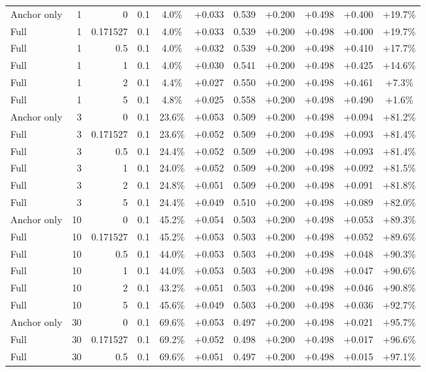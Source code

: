 \begin{table}[htbp]
\begin{tabular}{lrrrccccccc}
Anchor only & 1 & 0 & 0.1 & 4.0\% & +0.033 & 0.539 & +0.200 & +0.498 & +0.400 & +19.7\% \\
Full & 1 & 0.171527 & 0.1 & 4.0\% & +0.033 & 0.539 & +0.200 & +0.498 & +0.400 & +19.7\% \\
Full & 1 & 0.5 & 0.1 & 4.0\% & +0.032 & 0.539 & +0.200 & +0.498 & +0.410 & +17.7\% \\
Full & 1 & 1 & 0.1 & 4.0\% & +0.030 & 0.541 & +0.200 & +0.498 & +0.425 & +14.6\% \\
Full & 1 & 2 & 0.1 & 4.4\% & +0.027 & 0.550 & +0.200 & +0.498 & +0.461 & +7.3\% \\
Full & 1 & 5 & 0.1 & 4.8\% & +0.025 & 0.558 & +0.200 & +0.498 & +0.490 & +1.6\% \\
Anchor only & 3 & 0 & 0.1 & 23.6\% & +0.053 & 0.509 & +0.200 & +0.498 & +0.094 & +81.2\% \\
Full & 3 & 0.171527 & 0.1 & 23.6\% & +0.052 & 0.509 & +0.200 & +0.498 & +0.093 & +81.4\% \\
Full & 3 & 0.5 & 0.1 & 24.4\% & +0.052 & 0.509 & +0.200 & +0.498 & +0.093 & +81.4\% \\
Full & 3 & 1 & 0.1 & 24.0\% & +0.052 & 0.509 & +0.200 & +0.498 & +0.092 & +81.5\% \\
Full & 3 & 2 & 0.1 & 24.8\% & +0.051 & 0.509 & +0.200 & +0.498 & +0.091 & +81.8\% \\
Full & 3 & 5 & 0.1 & 24.4\% & +0.049 & 0.510 & +0.200 & +0.498 & +0.089 & +82.0\% \\
Anchor only & 10 & 0 & 0.1 & 45.2\% & +0.054 & 0.503 & +0.200 & +0.498 & +0.053 & +89.3\% \\
Full & 10 & 0.171527 & 0.1 & 45.2\% & +0.053 & 0.503 & +0.200 & +0.498 & +0.052 & +89.6\% \\
Full & 10 & 0.5 & 0.1 & 44.0\% & +0.053 & 0.503 & +0.200 & +0.498 & +0.048 & +90.3\% \\
Full & 10 & 1 & 0.1 & 44.0\% & +0.053 & 0.503 & +0.200 & +0.498 & +0.047 & +90.6\% \\
Full & 10 & 2 & 0.1 & 43.2\% & +0.051 & 0.503 & +0.200 & +0.498 & +0.046 & +90.8\% \\
Full & 10 & 5 & 0.1 & 45.6\% & +0.049 & 0.503 & +0.200 & +0.498 & +0.036 & +92.7\% \\
Anchor only & 30 & 0 & 0.1 & 69.6\% & +0.053 & 0.497 & +0.200 & +0.498 & +0.021 & +95.7\% \\
Full & 30 & 0.171527 & 0.1 & 69.2\% & +0.052 & 0.498 & +0.200 & +0.498 & +0.017 & +96.6\% \\
Full & 30 & 0.5 & 0.1 & 69.6\% & +0.051 & 0.497 & +0.200 & +0.498 & +0.015 & +97.1\% \\

\end{tabular}
\end{table}
